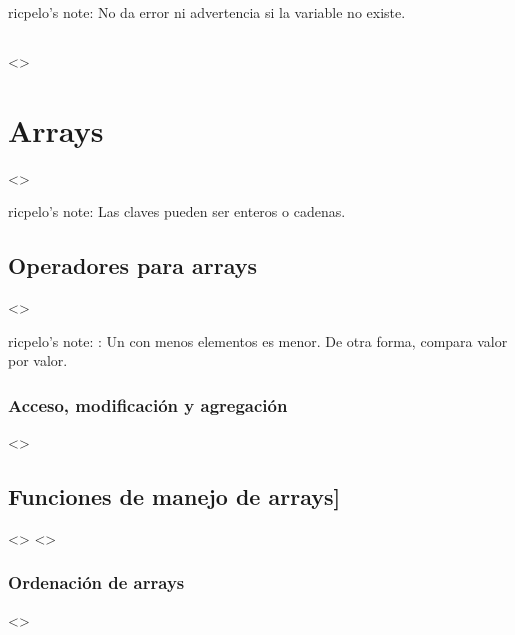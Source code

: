 \documentclass[a4paper,12pt,spanish]{sphinxmanual}
\begin{document}
ricpelo’s note: No da error ni advertencia si la variable no existe.


\subsection{}
\label{\detokenize{php:id6}}
\textless{}\textgreater{}


\section{Arrays}
\label{\detokenize{php:arrays}}
\textless{}\textgreater{}

ricpelo’s note: Las claves pueden ser enteros o cadenas.


\subsection{Operadores para arrays}
\label{\detokenize{php:operadores-para-arrays}}
\textless{}\textgreater{}

ricpelo’s note: : Un  con menos elementos es
menor. De otra forma, compara valor por valor.


\subsubsection{Acceso, modificación y agregación}
\label{\detokenize{php:acceso-modificacion-y-agregacion}}
\textless{}\textgreater{}


\subsection{Funciones de manejo de arrays{]}}
\label{\detokenize{php:funciones-de-manejo-de-arrays}}
\textless{}\textgreater{}
\textless{}\textgreater{}


\subsubsection{Ordenación de arrays}
\label{\detokenize{php:ordenacion-de-arrays}}
\textless{}\textgreater{}
\end{document}
